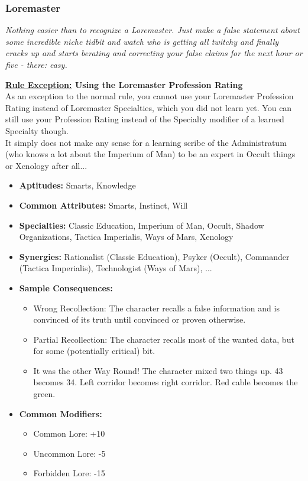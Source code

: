 \subsubsection{Loremaster}\label{Loremaster}
\textit{Nothing easier than to recognize a Loremaster.
Just make a false statement about some incredible niche tidbit and watch who is getting all twitchy and finally cracks up and starts berating and correcting your false claims for the next hour or five - there: easy.}
\begin{DndReadAloud}
\textbf{\underline{Rule Exception:} Using the Loremaster Profession Rating}\\
As an exception to the normal rule, you cannot use your Loremaster Profession Rating instead of Loremaster Specialties, which you did not learn yet. You can still use your Profession Rating instead of the Specialty modifier of a learned Specialty though.\\
It simply does not make any sense for a learning scribe of the Administratum (who knows a lot about the Imperium of Man) to be an expert in Occult things or Xenology after all...
\end{DndReadAloud}
\begin{itemize}
	\item \textbf{Aptitudes:} Smarts, Knowledge
	\item \textbf{Common Attributes:} Smarts, Instinct, Will
	\item \textbf{Specialties:} Classic Education, Imperium of Man, Occult, Shadow Organizations, Tactica Imperialis, Ways of Mars, Xenology
	\item \textbf{Synergies:} Rationalist (Classic Education), Psyker (Occult), Commander (Tactica Imperialis), Technologist (Ways of Mars), ...
	\item \textbf{Sample Consequences:} 
	\begin{itemize}
		\item Wrong Recollection: The character recalls a false information and is convinced of its truth until convinced or proven otherwise.
		\item Partial Recollection: The character recalls most of the wanted data, but for some (potentially critical) bit.
		\item It was the other Way Round! The character mixed two things up. 43 becomes 34. Left corridor becomes right corridor. Red cable becomes the green.
	\end{itemize}
	\item \textbf{Common Modifiers:}
	\begin{itemize}
		\item Common Lore: +10
		\item Uncommon Lore: -5
		\item Forbidden Lore: -15
	\end{itemize}
\end{itemize}

